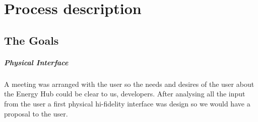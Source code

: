 \chapter{Process description}
\section{The Goals}
\paragraph{Physical Interface}

A meeting was arranged with the user so the needs and desires of the user about the Energy Hub could be clear to us, developers. After analysing all the input from the user a first physical hi-fidelity interface was design so we would have a proposal to the user. 

 